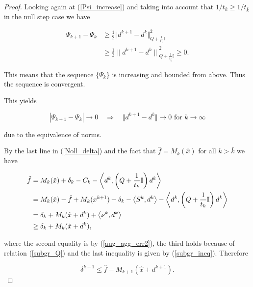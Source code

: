 \begin{proof}
Looking again at (\ref{Psi_increase}) and taking into account that \(1/t_k \geq 1/t_{\bar{k}}\) in the null step case we have

\begin{align*}
	\Psi_{k+1} - \Psi_k & \geq \frac{1}{2}\Vert d^{k+1}-d^k\Vert^2_{Q+\frac{1}{t_k}\mathbb{I}} \\
	&\geq \frac{1}{2}{\lVert d^{k+1}-d^k\rVert}^2_{Q+\frac{1}{t_{\bar{k}}}\mathbb{I}} \geq 0.
\end{align*}

This means that the sequence \(\{\Psi_k\}\) is increasing and bounded from above. Thus the sequence is convergent.

This yields

\begin{equation}
	|\Psi_{k+1} - \Psi_k | \to 0 \quad \Rightarrow \quad \Vert d^{k+1}-d^k\Vert \to 0 \text{ for } k \to \infty
	\label{d_to_0}
\end{equation}

due to the equivalence of norms.


By the last line in (\ref{Noll_delta}) and the fact that \(\hat{f}=M_k(\hat{x})\) for all \(k > \bar{k}\) we have

\begin{align*}
	\hat{f} &= M_k(\hat{x})+\delta_k-C_k-\left\langle d^{k},\left(Q+\frac{1}{t_k}\mathbb{I}\right)d^{k}\right\rangle \\
	&= M_k(\hat{x})-\hat{f} + M_k(x^{k+1})+\delta_k -\left\langle S^k,d^k \right\rangle-\left\langle d^{k},\left(Q+\frac{1}{t_k}\mathbb{I}\right)d^{k}\right\rangle \\
	&= \delta_k + M_k(\hat{x}+d^k)+\left\langle \nu^k, d^k \right\rangle\\
	&\geq \delta_k+M_k(\hat{x}+d^k),
\end{align*}

where the second equality is by (\ref{aug_agg_err2}), the third holds because of relation (\ref{subgr_Q}) and the last inequality is given by (\ref{subgr_ineq}). Therefore 

\begin{equation}
	\delta^{k+1} \leq \hat{f}-M_{k+1}(\hat{x}+d^{k+1}).
	\label{dfM}
\end{equation}


\end{proof}
